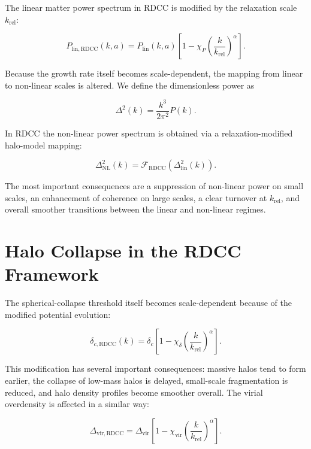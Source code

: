 \documentclass[11pt,a4paper]{article}
\begin{document}
The linear matter power spectrum in RDCC is modified by the relaxation scale \(k_{\mathrm{rel}}\):

\begin{equation}
    P_{\mathrm{lin,RDCC}}(k,a)
    = P_{\mathrm{lin}}(k,a)
      \left[1 - \chi_{P}\left(\frac{k}{k_{\mathrm{rel}}}\right)^{\alpha}\right].
\end{equation}

Because the growth rate itself becomes scale-dependent, the mapping from linear to non-linear scales is altered. We define the dimensionless power as

\begin{equation}
    \Delta^{2}(k) = \frac{k^{3}}{2\pi^{2}} P(k).
\end{equation}

In RDCC the non-linear power spectrum is obtained via a relaxation-modified halo-model mapping:

\begin{equation}
    \Delta_{\mathrm{NL}}^{2}(k)
    = \mathcal{F}_{\mathrm{RDCC}}
      \!\left(\Delta_{\mathrm{lin}}^{2}(k)\right).
\end{equation}

The most important consequences are a suppression of non-linear power on small scales, an enhancement of coherence on large scales, a clear turnover at \(k_{\mathrm{rel}}\), and overall smoother transitions between the linear and non-linear regimes.
\section{Halo Collapse in the RDCC Framework}

The spherical-collapse threshold itself becomes scale-dependent because of the modified potential evolution:

\begin{equation}
    \delta_{c,\mathrm{RDCC}}(k)
    = \delta_{c}
      \left[1 - \chi_{\delta}
      \left(\frac{k}{k_{\mathrm{rel}}}\right)^{\alpha}\right].
\end{equation}

This modification has several important consequences: massive halos tend to form earlier, the collapse of low-mass halos is delayed, small-scale fragmentation is reduced, and halo density profiles become smoother overall. The virial overdensity is affected in a similar way:

\begin{equation}
    \Delta_{\mathrm{vir,RDCC}}
    = \Delta_{\mathrm{vir}}
      \left[1 - \chi_{\mathrm{vir}}
      \left(\frac{k}{k_{\mathrm{rel}}}\right)^{\alpha}\right].
\end{equation}
\end{document}
